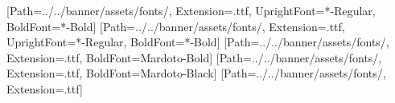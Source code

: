 %      
%

\usepackage{fontspec}
\def\idiotfontdir{../../banner/assets/fonts/}
\setsansfont{Mardoto}[Path=\idiotfontdir, Extension=.ttf, UprightFont=*-Regular, BoldFont=*-Bold]
\setmainfont{Mardoto}[Path=\idiotfontdir, Extension=.ttf, UprightFont=*-Regular, BoldFont=*-Bold]
\newfontfamily{}[Path=\idiotfontdir, Extension=.ttf, BoldFont=Mardoto-Bold]
\newfontfamily{}[Path=\idiotfontdir, Extension=.ttf, BoldFont=Mardoto-Black]
\newfontfamily{}[Path=\idiotfontdir, Extension=.ttf] %
\newfontfamily{} %
\renewcommand{\emph}[1]{{\mediumfont\color{plum}#1}}

\usepackage{graphicx}
\usepackage{booktabs}
\usepackage{array} %
\usepackage[most]{tcolorbox}
\usepackage{tikz}
\usetikzlibrary{arrows.meta, positioning, calc, shapes.geometric, shapes.callouts, shapes.misc,
  decorations.pathmorphing, decorations.pathreplacing, backgrounds, fit, patterns.meta}
\usepackage{pgfplots}
\usepackage{qrcode} %
\pgfplotsset{compat=1.18}
\graphicspath{{../common/art/}{images/}}

